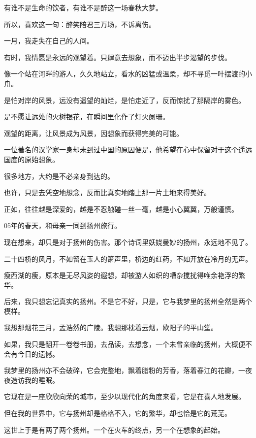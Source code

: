 \documentclass[12pt,a4paper]{article}
\begin{document}
		有谁不是生命的饮者，有谁不是醉这一场春秋大梦。\par
		所以，喜欢这一句：醉笑陪君三万场，不诉离伤。

		一月，我走失在自己的人间。

	\endwriting



		有时，我情愿是永远的观望着。只肆意去想象，而不迈出半步渴望的步伐。\par
		像一个站在河畔的游人，久久地站立，看水的凶猛或温柔，却不寻觅一叶摆渡的小舟。\par
		是怕对岸的风景，远没有遥望的灿烂，是怕走近了，反而惊扰了那隔岸的雾色。\par
		是不愿让远处的火树银花，在瞬间里化作了灯火阑珊。

		观望的距离，让风景成为风景，因想象而获得完美的可能。\par
		一位著名的汉学家一身却未到过中国的原因便是，他希望在心中保留对于这个遥远国度的原始想象。

		很多地方，大约是不必亲身到达的。\par
		也许，只是去凭空地想念，反而比真实地踏上那一片土地来得美好。\par
		正如，往往越是深爱的，越是不忍触碰一丝一毫，越是小心翼翼，万般谨慎。

		05年的春天，和母亲一同到扬州旅行。\par
		现在想来，却只是对于扬州的伤害。那个诗词里妖娆曼妙的扬州，永远地不见了。

		二十四桥的风月，不如留在玉人的箫声里，桥边的红药，不如开放在冷月的无声。\par
		瘦西湖的瘦，原本是无尽风姿的遐想，却被游人如织的嘈杂搅扰得唯余艳浮的繁华。\par
		后来，我只想忘记真实的扬州。不是它不好，只是，它与我梦里的扬州全然是两个模样。\par
		我想那烟花三月，孟浩然的广陵。我想那枕着云烟，欧阳子的平山堂。\par
		如果，我只是翻开一卷卷书册，去品读，去想念，一个未曾亲临的扬州，大概便不会有今日的遗憾。\par
		我梦里的扬州亦不会破碎，它会完整地，飘着脂粉的芳香，落着春江的花瓣，一夜夜造访我的睡眠。\par
		它现在是一座欣欣向荣的城市，至少以现代化的角度来看，它是在喜人地发展。\par
		但在我的世界中，它与扬州却是格格不入，它的繁华，却也恰是它的荒芜。\par
		这世上于是有两了两个扬州。一个在火车的终点，另一个在想象的起始。
\end{document}
